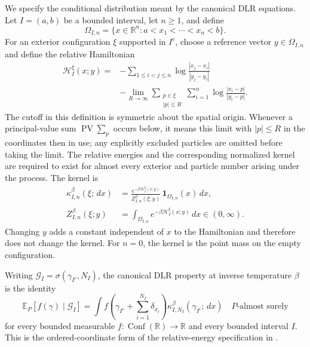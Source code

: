 \documentclass[11pt,reqno]{amsart}
\numberwithin{equation}{section}
\theoremstyle{definition}
\theoremstyle{remark}
\newcommand{\R}{\mathbb R}
\newcommand{\E}{\mathbb E}
\newcommand{\1}{\mathbf 1}
\newcommand{\Conf}{\operatorname{Conf}}
\newcommand{\PV}{\operatorname{PV}}
\newcommand{\dd}{\,d}
\begin{document}
We specify the conditional distribution meant by the canonical DLR
equations. Let $I=(a,b)$ be a bounded interval, let $n\ge1$, and define
\[
\Omega_{I,n}=\{x\in\R^n:a<x_1<\cdots<x_n<b\}.
\]
For an exterior configuration $\xi$ supported in $I^c$, choose a
reference vector $y\in\Omega_{I,n}$ and define the relative Hamiltonian
\begin{equation}\label{eq:dlr-relative-energy}
\begin{split}
\mathscr H_I^\xi(x;y)
={}&-\sum_{1\le i<j\le n}
       \log\frac{|x_j-x_i|}{|y_j-y_i|}\\
&-\lim_{R\to\infty}
  \sum_{\substack{p\in\xi\\|p|\le R}}\sum_{i=1}^n
       \log\frac{|x_i-p|}{|y_i-p|}.
\end{split}
\end{equation}
The cutoff in this definition is symmetric about the spatial origin.
Whenever a principal-value sum $\PV\sum_p$ occurs below, it means this
limit with $|p|\le R$ in the coordinates then in use; any explicitly
excluded particles are omitted before taking the limit. The relative
energies and the corresponding normalized kernel are required to exist
for almost every exterior and particle number arising under the process.
The kernel is
\begin{equation}\label{eq:dlr-kernel}
\begin{aligned}
\kappa_{I,n}^\beta(\xi;\dd x)
 &=\frac{e^{-\beta\mathscr H_I^\xi(x;y)}}
         {Z_{I,n}^\beta(\xi;y)}\,\1_{\Omega_{I,n}}(x)\dd x,\\
Z_{I,n}^\beta(\xi;y)
 &=\int_{\Omega_{I,n}}e^{-\beta\mathscr H_I^\xi(x;y)}\dd x
 \in(0,\infty).
\end{aligned}
\end{equation}
Changing $y$ adds a constant independent of $x$ to the Hamiltonian and
therefore does not change the kernel. For $n=0$, the kernel is the point
mass on the empty configuration.

Writing $\mathscr G_I=\sigma(\gamma_{I^c},N_I)$, the canonical DLR
property at inverse temperature $\beta$ is the identity
\begin{equation}\label{eq:dlr-identity}
\E_P[f(\gamma)\mid\mathscr G_I]
 =\int f\!\left(\gamma_{I^c}+\sum_{i=1}^{N_I}\delta_{x_i}\right)
       \kappa_{I,N_I}^\beta(\gamma_{I^c};\dd x)
 \quad P\text{-almost surely}
\end{equation}
for every bounded measurable $f:\Conf(\R)\to\R$ and every bounded
interval $I$. This is the ordered-coordinate form of the relative-energy
specification in \cite[Section~2.1]{DHLM}.
\end{document}
